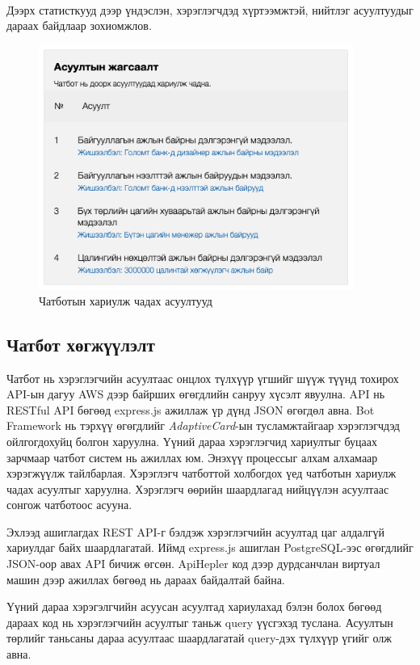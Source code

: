 \\Дээрх статисткууд дээр үндэслэн, хэрэглэгчдэд хүртээмжтэй, нийтлэг асуултуудыг дараах байдлаар зохиомжлов. 
\begin{figure}[ht]
  \centering
  \includegraphics[height=8cm]{images/questions.png}
  \caption{Чатботын хариулж чадах асуултууд}\label{fig:questions}
\end{figure}

\newpage
\subsection{Чатбот хөгжүүлэлт}
Чатбот нь хэрэглэгчийн асуултаас онцлох түлхүүр үгшийг шүүж түүнд тохирох API-ын дагуу AWS дээр байрших өгөгдлийн санруу хүсэлт явуулна. API нь RESTful API бөгөөд express.js ажиллаж үр дүнд JSON өгөгдөл авна. Bot Framework нь тэрхүү өгөгдлийг  \textit{AdaptiveCard}-ын тусламжтайгаар хэрэглэгчдэд ойлгогдохуйц болгон харуулна. Үүний дараа хэрэглэгчид хариултыг буцаах зарчмаар чатбот систем нь ажиллах юм. Энэхүү процессыг алхам алхамаар хэрэгжүүлж тайлбарлая. Хэрэглэгч чатботтой холбогдох үед чатботын хариулж чадах асуултыг харуулна. Хэрэглэгч өөрийн шаардлагад нийцүүлэн асуултаас сонгож чатботоос асууна. 

Эхлээд ашиглагдах REST API-г бэлдэж хэрэглэгчийн асуултад цаг алдалгүй хариулдаг байх шаардлагатай. Иймд express.js ашиглан PostgreSQL-ээс өгөгдлийг JSON-оор авах API бичиж өгсөн. ApiHepler код дээр дурдсанчлан виртуал машин дээр ажиллах бөгөөд нь дараах байдалтай байна. 


Үүний дараа хэрэгэлгчийн асуусан асуултад хариулахад бэлэн болох бөгөөд дараах код нь хэрэглэгчийн асуултыг таньж query үүсгэхэд туслана. Асуултын төрлийг таньсаны дараа асуултаас шаардлагатай query-дэх түлхүүр үгийг олж авна. 



